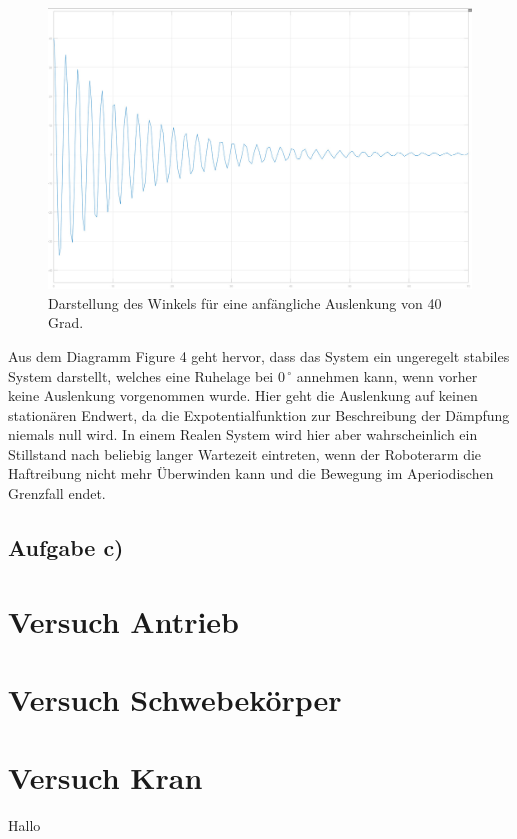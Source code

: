 \documentclass[11pt]{scrartcl}
\begin{document}
\begin{figure}[H]
	\centering
	\includegraphics[width=1\textwidth]{WinkelanzeigeinGrad3b.jpeg}
	\caption{Darstellung des Winkels für eine anfängliche Auslenkung von 40 Grad. }
	\label{img:grafik-dummy}
\end{figure}
Aus dem Diagramm Figure 4 geht hervor, dass das System ein ungeregelt stabiles System darstellt, welches eine Ruhelage bei 0\,$^\circ$ annehmen kann, wenn vorher keine Auslenkung vorgenommen wurde. Hier geht die Auslenkung auf keinen stationären Endwert, da die Expotentialfunktion zur Beschreibung der Dämpfung niemals null wird. In einem Realen System wird hier aber wahrscheinlich ein Stillstand nach beliebig langer Wartezeit eintreten, wenn der Roboterarm die Haftreibung nicht mehr Überwinden kann und die Bewegung im Aperiodischen Grenzfall endet.

\subsection{Aufgabe c)}

\section{Versuch Antrieb}

\section{Versuch Schwebekörper}

\section{Versuch Kran}

Hallo
\end{document}
